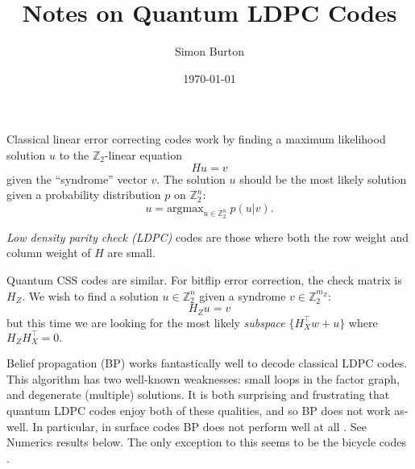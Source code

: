 \documentclass[12pt]{article}
\begin{document}
\title{Notes on Quantum LDPC Codes}

\author{Simon Burton}

\date{\today}


\maketitle




\def\Complex{\mathbb{C}}
\def\C{\mathbb{C}}
\def\Code{\mathcal{C}}
\def\R{\mathbb{R}}
\def\Z{\mathbb{Z}}
\def\Pauli{\mathcal{P}}
\def\Hom{\mbox{Hom}}
\def\Proveit{{\it (Proof??)}}
\def\GL{\mathrm{GL}}
\def\half{\frac{1}{2}}
\def\Im{\mbox{im}}
\def\Ker{\mbox{ker}}
\def\Field{\mathcal{F}}
\def\Defn#1{{\bf #1}}

\newcommand{\ket}[1]{|{#1}\rangle}
\newcommand{\expect}[1]{\langle{#1}\rangle}
\newcommand{\bra}[1]{\langle{#1}|}
\newcommand{\ketbra}[2]{\ket{#1}\!\bra{#2}}
\newcommand{\braket}[2]{\langle{#1}|{#2}\rangle}


%
%

Classical linear error correcting codes
work by finding a maximum likelihood solution $u$ to
the $\Z_2$-linear equation
$$
    Hu = v
$$
given the ``syndrome'' vector $v$.
The solution $u$ should be the most
likely solution given a probability
distribution $p$ on $\Z_2^n:$
$$
    u = \mbox{argmax}_{u\in\Z_2^n} \  p(u | v).
$$

{\em Low density parity check (LDPC)} codes
are those where both the row weight
and column weight of $H$ are small.

Quantum CSS codes are similar. 
For bitflip error correction,
the check matrix is $H_Z.$
We wish to find a solution $u\in\Z_2^n$ given a
syndrome $v\in\Z_2^{m_Z}:$
$$
    H_Z u = v
$$
but this time we are looking for the most
likely \emph{subspace} 
$ \{ H_X^\top w + u \} $
where $H_Z H_X^\top = 0.$

Belief propagation (BP) works fantastically well to
decode classical LDPC codes.
This algorithm has two well-known weaknesses:
small loops in the factor graph, and degenerate (multiple)
solutions.
It is both surprising and frustrating that 
quantum LDPC codes enjoy both of these qualities,
and so BP does not work as-well.
In particular, in surface codes BP does not
perform well at all \cite{poulin2008}.
See Numerics results below.
The only exception to this seems to be the
bicycle codes \cite{mackay2004}.
\end{document}
